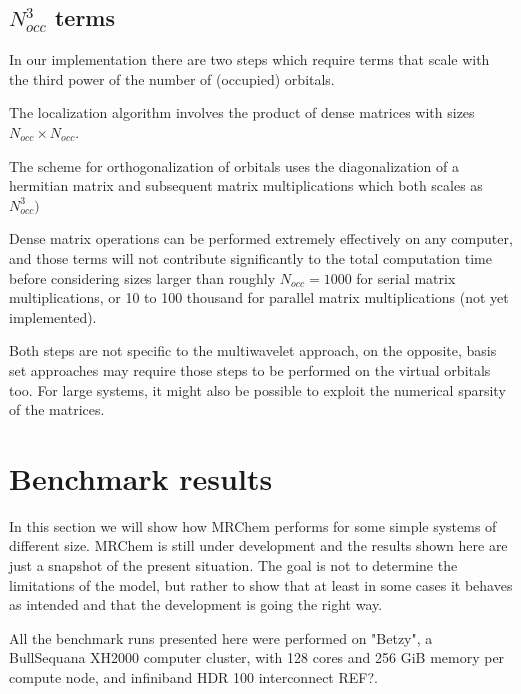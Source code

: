 \documentclass{article}
\begin{document}
\subsection{$N_{occ}^3$ terms}

In our implementation there are two steps which require terms that scale with the third power of the number of (occupied) orbitals. 

The localization algorithm involves the product of dense matrices with sizes $N_{occ} \times N_{occ}$. 

The scheme for orthogonalization of orbitals uses the diagonalization of a hermitian matrix and subsequent matrix multiplications which both scales as $N_{occ}^3)$

Dense matrix operations can be performed extremely effectively on any computer, and those terms will not contribute significantly to the total computation time before considering sizes larger than roughly $N_{occ}=1000$ for serial matrix multiplications, or 10 to 100 thousand for parallel matrix multiplications (not yet implemented). 

Both steps are not specific to the multiwavelet approach, on the opposite, basis set approaches may require those steps to be performed on the virtual orbitals too. For large systems, it might also be possible to exploit the numerical sparsity of the matrices.


\section{Benchmark results}

In this section we will show how MRChem performs for some simple systems of different size. MRChem is still under development and the results shown here are just a snapshot of the present situation. The goal is not to determine the limitations of the model, but rather to show that at least in some cases it behaves as intended and that the development is going the right way.

All the benchmark runs presented here were performed on "Betzy", a BullSequana XH2000 computer cluster, with 128 cores and 256 GiB memory per compute node, and infiniband HDR 100 interconnect REF?.
\end{document}
